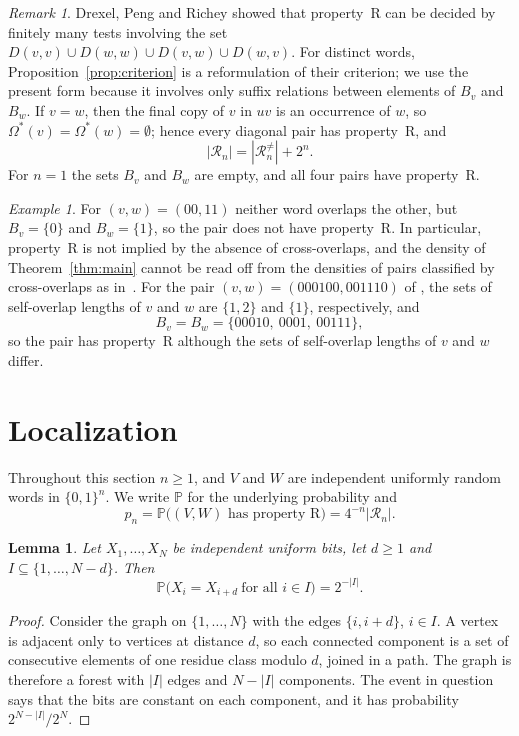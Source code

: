 \documentclass[11pt]{amsart}
\newtheorem{lemma}[theorem]{Lemma}
\theoremstyle{remark}
\newtheorem{remark}[theorem]{Remark}
\newtheorem{example}[theorem]{Example}
\numberwithin{equation}{section}
\newcommand{\Os}{\Omega^{*}}
\newcommand{\R}{\mathcal{R}}
\newcommand{\PP}{\mathbb{P}}
\newcommand{\bits}{\{0,1\}}
\begin{document}
\begin{remark}\label{rem:diag}
Drexel, Peng and Richey \cite[Lemma~19]{DPR} showed that property~R can be decided by finitely many tests involving the set $D(v,v)\cup D(w,w)\cup D(v,w)\cup D(w,v)$. For distinct words, Proposition~\ref{prop:criterion} is a reformulation of their criterion; we use the present form because it involves only suffix relations between elements of $B_v$ and $B_w$. If $v=w$, then the final copy of $v$ in $uv$ is an occurrence of $w$, so $\Os(v)=\Os(w)=\emptyset$; hence every diagonal pair has property~R, and
\begin{equation}\label{eq:diag}
  |\R_n|=|\R_n^{\neq}|+2^n .
\end{equation}
For $n=1$ the sets $B_v$ and $B_w$ are empty, and all four pairs have property~R.
\end{remark}

\begin{example}\label{ex:pairs}
For $(v,w)=(00,11)$ neither word overlaps the other, but $B_v=\{0\}$ and $B_w=\{1\}$, so the pair does not have property~R. In particular, property~R is not implied by the absence of cross-overlaps, and the density of Theorem~\ref{thm:main} cannot be read off from the densities of pairs classified by cross-overlaps as in~\cite{Gab}. For the pair $(v,w)=(000100,001110)$ of \cite[p.~9]{DPR}, the sets of self-overlap lengths of $v$ and $w$ are $\{1,2\}$ and $\{1\}$, respectively, and
\[
  B_v=B_w=\{00010,\ 0001,\ 00111\},
\]
so the pair has property~R although the sets of self-overlap lengths of $v$ and $w$ differ.
\end{example}

\section{Localization}\label{sec:local}

Throughout this section $n\ge1$, and $V$ and $W$ are independent uniformly random words in $\bits^n$. We write $\PP$ for the underlying probability and
\[
  p_n=\PP\bigl((V,W)\text{ has property R}\bigr)=4^{-n}|\R_n| .
\]

\begin{lemma}\label{lem:forest}
Let $X_1,\dots,X_N$ be independent uniform bits, let $d\ge1$ and $I\subseteq\{1,\dots,N-d\}$. Then
\[
  \PP\bigl(X_i=X_{i+d}\ \text{for all } i\in I\bigr)=2^{-|I|}.
\]
\end{lemma}

\begin{proof}
Consider the graph on $\{1,\dots,N\}$ with the edges $\{i,i+d\}$, $i\in I$. A vertex is adjacent only to vertices at distance $d$, so each connected component is a set of consecutive elements of one residue class modulo $d$, joined in a path. The graph is therefore a forest with $|I|$ edges and $N-|I|$ components. The event in question says that the bits are constant on each component, and it has probability $2^{N-|I|}/2^{N}$.
\end{proof}
\end{document}
